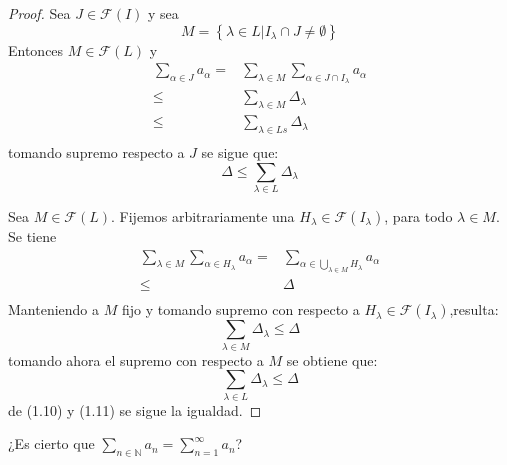 \documentclass[12pt]{report}
\theoremstyle{largebreak}
\begin{document}
    \begin{proof}
        Sea $J\in\mathcal{F}(I)$ y sea
        \begin{equation*}
            M=\left\{\lambda\in L\big|I_\lambda\cap J\neq\emptyset \right\}
        \end{equation*}
        Entonces $M\in \mathcal{F}(L)$ y
        \begin{equation*}
            \begin{split}
                \sum_{\alpha\in J}a_\alpha=&\sum_{\lambda\in M} \sum_{\alpha\in J\cap I_\lambda}a_\alpha\\
                \leq&\sum_{\lambda\in M}\Delta_\lambda\\
                \leq&\sum_{\lambda\in Ls}\Delta_\lambda\\
            \end{split}
        \end{equation*}
        tomando supremo respecto a $J$ se sigue que:
        \begin{equation}
            \Delta\leq\sum_{\lambda\in L}\Delta_\lambda
        \end{equation}

        Sea $M\in\mathcal{F}(L)$. Fijemos arbitrariamente una $H_\lambda\in\mathcal{F}(I_\lambda)$, para todo $\lambda\in M$. Se tiene
        \begin{equation*}
            \begin{split}
                \sum_{\lambda\in M}\sum_{\alpha\in H_\lambda}a_\alpha=&\sum_{\alpha\in \bigcup_{\lambda\in M}H_\lambda}a_\alpha\\
                \leq&\Delta\\
            \end{split}
        \end{equation*}
        Manteniendo a $M$ fijo y tomando supremo con respecto a $H_\lambda\in\mathcal{F}(I_\lambda)$,resulta:
        \begin{equation*}
            \sum_{\lambda\in M}\Delta_\lambda\leq\Delta
        \end{equation*}
        tomando ahora el supremo con respecto a $M$ se obtiene que:
        \begin{equation}
            \sum_{\lambda\in L}\Delta_\lambda\leq\Delta
        \end{equation}
        de (1.10) y (1.11) se sigue la igualdad.

    \end{proof}

    \begin{exa}
        ¿Es cierto que $\sum_{n\in\mathbb{N}}a_n=\sum_{n=1}^{\infty}a_n$?
    \end{exa}
\end{document}
